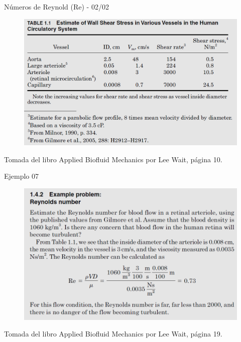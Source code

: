 \begin{frame}{Números de Reynold (Re) - 02/02}
\justifying
\begin{figure}[H]
\centering
\includegraphics[scale=0.4]{Section_Files/picmanuel/39.png}
\label{fig: Figura2-32}
\end{figure}
{\tiny Tomada del libro Applied Biofluid Mechanics por Lee Wait, página 10.}
\end{frame}

\begin{frame}{Ejemplo 07}
\justifying
\begin{figure}[H]
\centering
\includegraphics[scale=0.4]{Section_Files/picmanuel/40.png}
\label{fig: Figura2-33}
\end{figure}
{\tiny Tomada del libro Applied Biofluid Mechanics por Lee Wait, página 19.}
\end{frame}

